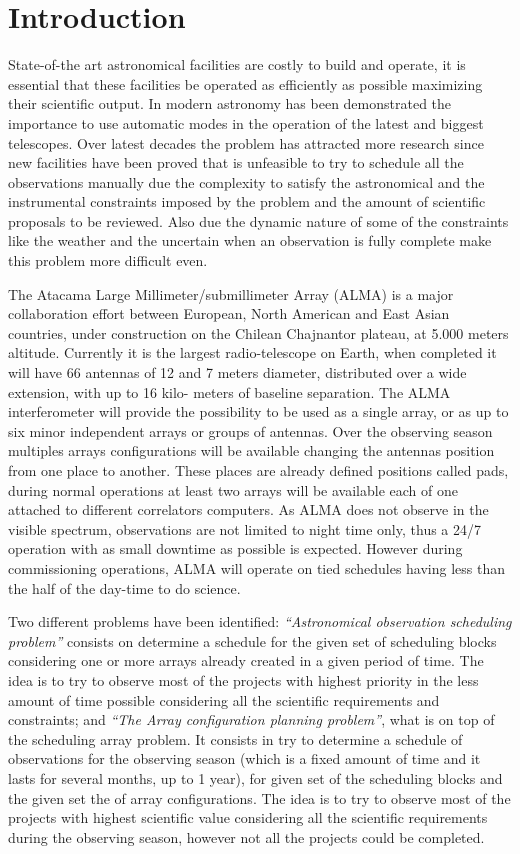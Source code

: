 \chapter{Introduction}

State-of-the art astronomical facilities are costly to build and operate, it is essential that these facilities be
operated as efficiently as possible maximizing their scientific output. In modern astronomy has been
demonstrated the importance to use automatic modes in the operation of the latest and biggest
telescopes. Over latest decades the problem has attracted more research since new facilities have been
proved that is unfeasible to try to schedule all the observations manually due the complexity to satisfy
the astronomical and the instrumental constraints imposed by the problem and the amount of scientific
proposals to be reviewed. Also due the dynamic nature of some of the constraints like the weather and
the uncertain when an observation is fully complete make this problem more difficult even.

The Atacama Large Millimeter/submillimeter Array (ALMA) is a major collaboration effort between
European, North American and East Asian countries, under construction on the Chilean Chajnantor
plateau, at 5.000 meters altitude. Currently it is the largest radio-telescope on Earth, when completed it
will have 66 antennas of 12 and 7 meters diameter, distributed over a wide extension, with up to 16 kilo-
meters of baseline separation. The ALMA interferometer will provide the possibility to be used as a single
array, or as up to six minor independent arrays or groups of antennas. Over the observing season
multiples arrays configurations will be available changing the antennas position from one place to
another. These places are already defined positions called pads, during normal operations at least two
arrays will be available each of one attached to different correlators computers. As ALMA does not
observe in the visible spectrum, observations are not limited to night time only, thus a 24/7 operation
with as small downtime as possible is expected. However during commissioning operations, ALMA will operate on tied schedules having less than the half of the day-time to do science.

Two different problems have been identified: \textit{``Astronomical observation scheduling problem''} consists on determine a
schedule for the given set of scheduling blocks considering one or more arrays already created in a given
period of time. The idea is to try to observe most of the projects with highest priority in the less amount
of time possible considering all the scientific requirements and constraints; and \textit{``The  Array configuration planning problem''}, what  
is on top of the scheduling array problem. It consists in try to determine a schedule of
observations for the observing season (which is a fixed amount of time and it lasts for several months, up
to 1 year), for given set of the scheduling blocks and the given set the of array configurations. The idea is
to try to observe most of the projects with highest scientific value considering all the scientific
requirements during the observing season, however not all the projects could be completed.

